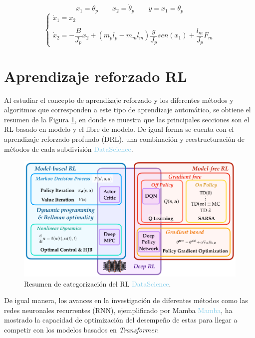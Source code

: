 \[x_1 = \theta_p \qquad x_2 = \dot{\theta}_p \qquad y = x_1 = \theta_p\]
\begin{equation}
	\left \{ \begin{array}{lcc} \dot{x}_1 = x_2 \\ \\ \dot{x}_2 = -\dfrac{B}{J_p} x_2 + (m_p l_p -m_m l_m)\dfrac{g}{J_p}sen(x_1) +\dfrac{l_m}{J_p}F_m \end{array} \right.
	\label{ecu:ecuestados}
\end{equation}




\section{Aprendizaje reforzado RL}


Al estudiar el concepto de aprendizaje reforzado y los diferentes métodos y algoritmos que corresponden a este tipo de aprendizaje automático, se obtiene el resumen de la Figura \ref{fig:teoriaRL}, en donde se muestra que las principales secciones son el RL basado en modelo y el libre de modelo. De igual forma se cuenta con el aprendizaje reforzado profundo (DRL), una combinación y reestructuración de métodos de cada subdivisión \textcolor{SkyBlue}{DataScience}.

\begin{figure}[hh]
	\centering
	\includegraphics[scale=0.35]{fig/new/CatRL.png}
	\caption{Resumen de categorización del RL \textcolor{SkyBlue}{DataScience}.}
	\label{fig:teoriaRL}
\end{figure}


De igual manera, los avances en la investigación de diferentes métodos como las redes neuronales recurrentes (RNN), ejemplificado por Mamba \textcolor{SkyBlue}{Mamba}, ha mostrado la capacidad de optimización del desempeño de estas para llegar a competir con los modelos basados en \textit{Transformer}.




